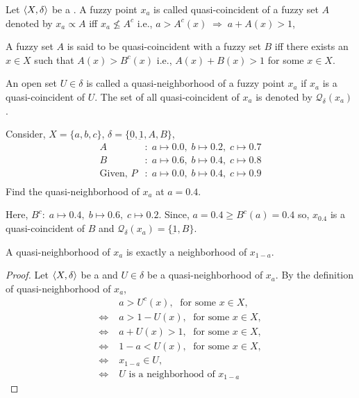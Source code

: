 \documentclass[../main-sheet.tex]{subfiles}
\begin{document}
\begin{defn}
    Let \(\langle X, \delta \rangle\) be a \fts. A fuzzy point \(x_a \) is called quasi-coincident of a fuzzy set \(A \) denoted by \(x_a \propto A \) iff \(x_a\not\leq A^c\) i.e., \(a>A^c(x)\;\Rightarrow\;a+A(x)>1\),
\end{defn}
\begin{defn}
    A fuzzy set \(A  \)  is said to be quasi-coincident with a fuzzy set \(B \) iff there exists an \(x\in X \) such that \(A(x)>B^c(x)\) i.e., \(A(x)+B(x)>1\) for some \(x\in X \).
\end{defn}
\begin{defn}
    An open set \(U\in\delta\) is called a quasi-neighborhood of a fuzzy point \(x_a \) if \(x_a \) is a quasi-coincident of \(U \). The set of all quasi-coincident of \(x_a\) is denoted by \(\mathcal{Q }_\delta (x_a)\).
\end{defn}
\begin{ex}
    Consider, \(X=\{a,b,c \}\), \(\delta=\{\underbar{0},\underbar{1},A,B \}\),
    \begin{align*}
        A&:\;a\mapsto 0.0,\;b\mapsto0.2,\;c\mapsto0.7\\
        B&:\;a\mapsto 0.6,\;b\mapsto0.4,\;c\mapsto0.8\\
        \text{Given, }P&:\;a\mapsto 0.0,\;b\mapsto0.4,\;c\mapsto0.9\\
    \end{align*}
    Find the quasi-neighborhood of \(x_a \) at \(a=0.4\).
\end{ex}
\begin{soln}
    Here, \(B^c:\;a\mapsto 0.4,\;b\mapsto0.6,\;c\mapsto0.2\). Since, \(a=0.4\geq B^c(a)=0.4\) so, \(x_{0.4}\) is a quasi-coincident of \(B \) and \(\mathcal{Q}_\delta(x_a)=\{\underbar{1},B\}\).
\end{soln}
\newpage
\begin{thm}
    A quasi-neighborhood of \(x_a \) is exactly a neighborhood of \(x_{1-a } \).
\end{thm}
\begin{proof}
    Let \(\langle X, \delta \rangle \) be a \fts\s and \(U\in\delta\) be a quasi-neighborhood of \(x_a \). By the definition of quasi-neighborhood of \(x_a \),
    \begin{align*}
        & a>U^c(x),\;\text{ for some } x\in X,\\
        \Leftrightarrow\;& a>1-U(x),\;\text{ for some } x\in X,\\
        \Leftrightarrow\;& a+U(x)>1,\;\text{ for some } x\in X,\\
        \Leftrightarrow\;& 1-a< U(x),\;\text{ for some } x\in X,\\
        \Leftrightarrow\;& x_{1-a}\in U,\\
        \Leftrightarrow\;& U\text{ is a neighborhood of } x_{1-a}
    \end{align*}
\end{proof}
\end{document}
